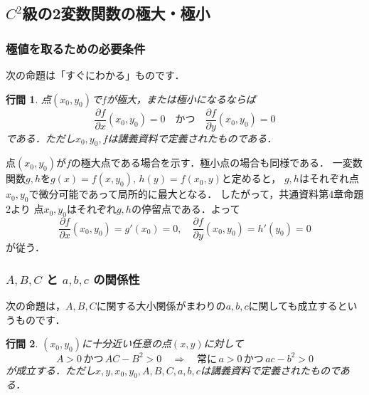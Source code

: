 \documentclass{article}
\makeatletter
\renewenvironment{proof}[1][\proofname]{\par
        \pushQED{\qed}
        \normalfont
        \topsep6\p@\@plus6\p@ \trivlist
        \item[\hskip\labelsep{\bfseries #1}\@addpunct{\bfseries}]\ignorespaces
    }{%
        \popQED\endtrivlist\@endpefalse
    }
\renewcommand{\proofname}{\underline{証明.}}
\newtheorem{lemma}{行間}
\makeatother
\begin{document}
\subsection{$C^2$級の2変数関数の極大・極小}

\subsubsection{極値を取るための必要条件}
次の命題は「すぐにわかる」ものです．
\begin{screen}
    \begin{lemma}
        点$(x_0, y_0)$で$f$が極大，または極小になるならば
        \begin{equation}
            \frac{\partial f}{\partial x}(x_0, y_0) = 0
            \quad \mbox{かつ} \quad
            \frac{\partial f}{\partial y}(x_0, y_0) = 0
        \end{equation}
        である．ただし$x_0, y_0, f$は講義資料で定義されたものである．
    \end{lemma}
\end{screen}

\begin{proof}
    点$(x_0, y_0)$が$f$の極大点である場合を示す．極小点の場合も同様である．
    一変数関数$g, h$を$g(x) = f(x, y_0),\,h(y) = f(x_0, y)$と定めると，
    $g, h$はそれぞれ点$x_0, y_0$で微分可能であって局所的に最大となる．
    したがって，共通資料第4章命題2より
    点$x_0, y_0$はそれぞれ$g, h$の停留点である．よって
    \begin{equation}
        \frac{\partial f}{\partial x}(x_0, y_0) = g'(x_0) = 0
        ,\quad
        \frac{\partial f}{\partial y}(x_0, y_0) = h'(y_0) = 0
    \end{equation}
    が従う．
\end{proof}

\subsubsection{$A, B, C$ と $a, b, c$ の関係性}
次の命題は，$A, B, C$に関する大小関係がまわりの$a, b, c$に関しても成立するというものです．
\begin{screen}
    \begin{lemma}
        $(x_0, y_0)$に十分近い任意の点$(x, y)$に対して
        \begin{equation}
            A > 0
            \,\mbox{かつ}\,
            AC - B^2 > 0
            \quad \Longrightarrow \quad
            \mbox{常に}\,
            a > 0
            \,\mbox{かつ}\,
            ac - b^2 > 0
        \end{equation}
        が成立する．ただし$x, y, x_0, y_0, A, B, C, a, b, c$は講義資料で定義されたものである．
    \end{lemma}
\end{screen}
\end{document}

